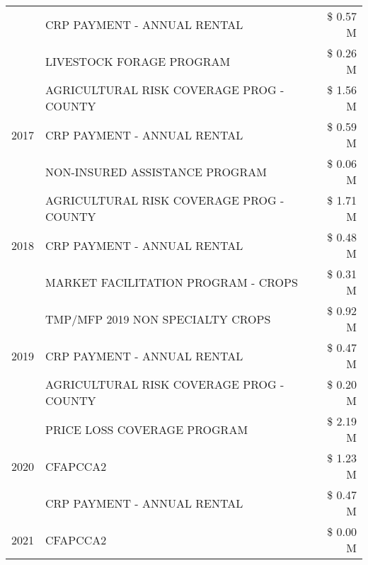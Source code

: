 \begin{tabular}{llr}
 & CRP PAYMENT - ANNUAL RENTAL                   & \$ 0.57 M \\
 & LIVESTOCK FORAGE PROGRAM                      & \$ 0.26 M \\
\cline{1-3}
\multirow[t]{3}{*}{2017} & AGRICULTURAL RISK COVERAGE PROG - COUNTY & \$ 1.56 M \\
 & CRP PAYMENT - ANNUAL RENTAL & \$ 0.59 M \\
 & NON-INSURED ASSISTANCE PROGRAM & \$ 0.06 M \\
\cline{1-3}
\multirow[t]{3}{*}{2018} & AGRICULTURAL RISK COVERAGE PROG - COUNTY & \$ 1.71 M \\
 & CRP PAYMENT - ANNUAL RENTAL & \$ 0.48 M \\
 & MARKET FACILITATION PROGRAM - CROPS & \$ 0.31 M \\
\cline{1-3}
\multirow[t]{3}{*}{2019} & TMP/MFP 2019 NON SPECIALTY CROPS & \$ 0.92 M \\
 & CRP PAYMENT - ANNUAL RENTAL & \$ 0.47 M \\
 & AGRICULTURAL RISK COVERAGE PROG - COUNTY & \$ 0.20 M \\
\cline{1-3}
\multirow[t]{3}{*}{2020} & PRICE LOSS COVERAGE PROGRAM & \$ 2.19 M \\
 & CFAPCCA2 & \$ 1.23 M \\
 & CRP PAYMENT - ANNUAL RENTAL & \$ 0.47 M \\
\cline{1-3}
2021 & CFAPCCA2 & \$ 0.00 M \\
\cline{1-3}
\bottomrule
\end{tabular}
